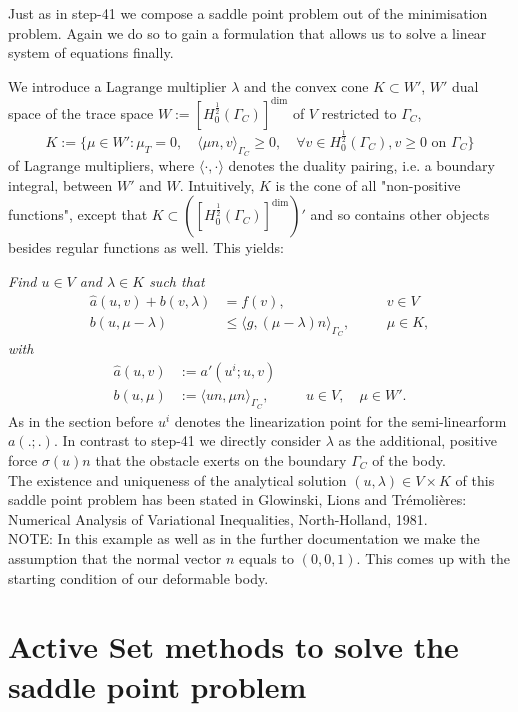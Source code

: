 \documentclass{article}
\begin{document}
Just as in step-41 we compose a saddle point problem out of the minimisation
problem. Again we do so to gain a formulation that allows us to solve a linear
system of equations finally.

We introduce a Lagrange multiplier $\lambda$ and the convex cone $K\subset W'$,
$W'$ dual space of the trace space $W:=\left[ H_0^{\frac{1}{2}}(\Gamma_C)
\right]^{\textrm{dim}}$ of $V$ restricted to $\Gamma_C$, $$K:=\{\mu\in W':\mu_T = 0,\quad\langle\mu n,v\rangle_{\Gamma_C}\geq 0,\quad
\forall v\in H_0^{\frac{1}{2}}(\Gamma_C), v \ge 0\text{ on }\Gamma_C \}$$
of Lagrange multipliers, where $\langle\cdot,\cdot\rangle$
denotes the duality pairing, i.e. a boundary integral, between $W'$ and $W$.
Intuitively, $K$ is the cone of all "non-positive functions", except that $ K\subset
\left( \left[ H_0^{\frac{1}{2}}(\Gamma_C) \right]^{\textrm{dim}} \right)' $ and
so contains other objects besides regular functions as well. This yields:

\textit{Find $u\in V$ and $\lambda\in K$ such that}
\begin{align*}
 \hat{a}(u,v) + b(v,\lambda) &= f(v),\quad &&v\in V\\
 b(u,\mu - \lambda) &\leq \langle g,(\mu -
 \lambda)n\rangle_{\Gamma_C},\quad&&\mu\in K,
\end{align*}
\textit{with}
\begin{align*}
 \hat{a}(u,v) &:= a'(u^i;u,v)\\
 b(u,\mu) &:= \langle un,\mu n\rangle_{\Gamma_C},\quad &&u\in V,\quad\mu\in W'.
\end{align*}
As in the section before $u^i$ denotes the linearization point for the
semi-linearform $a(.;.)$. In contrast to step-41 we directly consider $\lambda$
as the additional, positive force $\sigma(u)n$ that the obstacle
exerts on the boundary $\Gamma_C$ of the body.\\

\noindent
The existence and uniqueness of the analytical solution $(u,\lambda)\in V\times
K$ of this saddle point problem has been stated in Glowinski, Lions and Tr\'{e}moli\`{e}res: Numerical
Analysis of Variational Inequalities, North-Holland, 1981.\\

\noindent
NOTE: In this example as well as in the further documentation we make the
assumption that the normal vector $n$ equals to $(0,0,1)$. This comes up with
the starting condition of our deformable body.

\section{Active Set methods to solve the saddle point problem}
\end{document}
